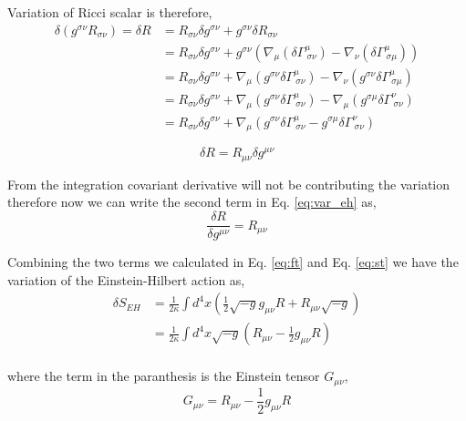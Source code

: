 Variation of Ricci scalar is therefore,
\begin{equation}
\label{eq:var_of_ricci_s}
\begin{split}
\delta\left(g^{\sigma\nu}R_{\sigma\nu}\right) = \delta R &= R_{\sigma\nu}\delta g^{\sigma\nu} + g^{\sigma\nu}\delta R_{\sigma\nu}\\
&= R_{\sigma\nu}\delta g^{\sigma\nu} + g^{\sigma\nu}\left( \nabla_{\mu}\left(\delta\Gamma^{\mu}_{\ \sigma\nu}\right) - \nabla_{\nu}\left(\delta\Gamma^{\mu}_{\ \sigma\mu}\right)\right)\\
&= R_{\sigma\nu}\delta g^{\sigma\nu} + \nabla_{\mu}\left(g^{\sigma\nu}\delta\Gamma^{\mu}_{\ \sigma\nu}\right) - \nabla_{\nu}\left(g^{\sigma\nu}\delta\Gamma^{\mu}_{\ \sigma\mu}\right)\\
&= R_{\sigma\nu}\delta g^{\sigma\nu} + \nabla_{\mu}\left(g^{\sigma\nu}\delta\Gamma^{\mu}_{\ \sigma\nu}\right) - \nabla_{\mu}\left(g^{\sigma\mu}\delta\Gamma^{\nu}_{\ \sigma\nu}\right)\\
&= R_{\sigma\nu}\delta g^{\sigma\nu} + \nabla_{\mu}\left(g^{\sigma\nu}\delta\Gamma^{\mu}_{\ \sigma\nu} - g^{\sigma\mu}\delta\Gamma^{\nu}_{\ \sigma\nu}\right)
\end{split}
\end{equation}

\begin{equation}
\delta R = R_{\mu\nu}\delta g^{\mu\nu}
\end{equation}

From the integration covariant derivative will not be contributing the variation therefore now we can write the second term in Eq. \ref{eq:var_eh} as,
\begin{equation}
\label{eq:st}
\frac{\delta R}{\delta g^{\mu\nu}} = R_{\mu\nu}
\end{equation}

Combining the two terms we calculated in Eq. \ref{eq:ft} and Eq. \ref{eq:st} we have the variation of the Einstein-Hilbert action as,
\begin{equation}
\begin{split}
\delta S_{EH} &= \frac{1}{2\kappa}\int d^{4}x\left(\frac{1}{2}\sqrt{-g}g_{\mu\nu}R + R_{\mu\nu}\sqrt{-g}\right)\\
&= \frac{1}{2\kappa}\int d^{4}x\sqrt{-g}\left(R_{\mu\nu} - \frac{1}{2}g_{\mu\nu}R\right)\\
\end{split}
\end{equation}

where the term in the paranthesis is the Einstein tensor $G_{\mu\nu}$,
\begin{equation}
G_{\mu\nu} = R_{\mu\nu} - \frac{1}{2}g_{\mu\nu}R
\end{equation}
